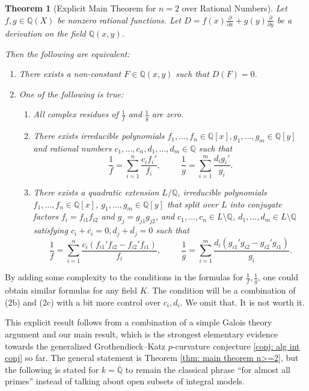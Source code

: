 \documentclass{amsart}
\newtheorem{thm}{Theorem}[section]
\theoremstyle{definition}
\begin{document}
\begin{thm}[Explicit Main Theorem for $n=2$ over Rational Numbers]\label{thm: explicit main thm in intro}
    Let $f,g\in \mathbb{Q}(X)$ be nonzero rational functions.
    Let $D=f(x)\frac{\partial}{\partial x}+g(y)\frac{\partial}{\partial y}$ be a derivation on the field $\mathbb{Q}(x,y)$.

    Then the following are equivalent:
    \begin{enumerate}
        \item There exists a non-constant $F\in \mathbb{Q}(x,y)$ such that $D(F)=0$.
        \item One of the following is true:
    \begin{enumerate}
        \item All complex residues of $\frac{1}{f}$ and $\frac{1}{g}$ are zero.
        \item There exists irreducible polynomials $f_1,\ldots,f_n\in \mathbb{Q}[x],g_1,\ldots,g_m\in\mathbb{Q}[y]$ and rational numbers $c_1,\ldots,c_n, d_1,\ldots,d_m \in\mathbb{Q}$ such that
        \[
        \frac{1}{f}=\sum_{i=1}^n \frac{c_i f_i'}{f_i}, \hspace{1cm} \frac{1}{g}=\sum_{i=1}^m \frac{d_i g_i'}{g_i}.
        \]
        \item There exists a quadratic extension $L/\mathbb{Q}$, irreducible polynomials $f_1,\ldots,f_n\in \mathbb{Q}[x]$, $g_1,\ldots,g_m\in\mathbb{Q}[y]$ that split over $L$ into conjugate factors $f_i=f_{i1}f_{i2}$ and $g_j=g_{j1}g_{j2}$, and $c_1,\ldots,c_n\in L\setminus \mathbb{Q}$, $d_1,\ldots,d_m\in L\setminus \mathbb{Q}$ satisfying $c_i+\overline{c_i}=0,d_j+\overline{d_j}=0$ such that
        \[
        \frac{1}{f}=\sum_{i=1}^n \frac{c_i (f_{i1}'f_{i2}-f_{i2}'f_{i1})}{f_i}, 
        \hspace{1cm} 
        \frac{1}{g}=\sum_{i=1}^m \frac{d_i (g_{i1}'g_{i2}-g_{i2}'g_{i1})}{g_i}.
        \]
    \end{enumerate}  
    \end{enumerate}
\end{thm}
By adding some complexity to the conditions in the formulas for $\frac{1}{f},\frac{1}{g}$, one could obtain similar formulas for any field $K$. The condition will be a combination of (2b) and (2c) with a bit more control over $c_i,d_i$. We omit that. It is not worth it.

This explicit result follows from a combination of a simple Galois theory argument and our main result, which is the strongest elementary evidence towards the generalized Grothendieck--Katz $p$-curvature conjecture \ref{conj: alg int conj} so far. The general statement is Theorem \ref{thm: main theorem n>=2}, but the following is stated for $k=\overline{\mathbb{Q}}$ to remain the classical phrase ``for almost all primes'' instead of talking about open subsets of integral models. 
\end{document}
